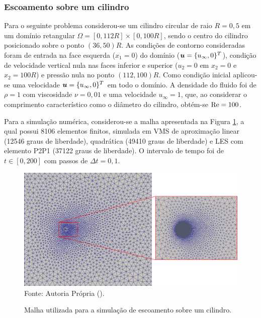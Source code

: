 \subsubsection{Escoamento sobre um cilindro}

Para o seguinte problema considerou-se um cilindro circular de raio $R=0,5$ em um domínio retangular $\Omega=[0,112R]\times[0,100R]$, sendo o centro do cilindro posicionado sobre o ponto $(36,50)R$. As condições de contorno consideradas foram de entrada na face esquerda ($x_1=0$) do domínio ($\boldsymbol{u}=\{u_\infty,0\}^T$), condição de velocidade vertical nula nas faces inferior e superior ($u_2=0$ em $x_2=0$ e $x_2=100R$) e pressão nula no ponto $(112,100)R$. Como condição inicial aplicou-se uma velocidade $\boldsymbol{u}=\{u_\infty,0\}^T$ em todo o domínio. A densidade do fluido foi de $\rho=1$ com viscosidade $\nu=0,01$ e uma velocidade $u_\infty=1$, que, ao considerar o comprimento característico como o diâmetro do cilindro, obtém-se $\mathrm{Re}=100$.

Para a simulação numérica, considerou-se a malha apresentada na Figura \ref{fig:cyl-mesh}, a qual possui 8106 elementos finitos, simulada em VMS de aproximação linear (12546 graus de liberdade), quadrática (49410 graus de liberdade) e LES com elemento P2P1 (37122 graus de liberdade). O intervalo de tempo foi de $t\in[0,200]$ com passos de $\Delta t=0,1$.

\begin{figure}[h!]
    \centering
    \caption{Malha utilizada para a simulação de escoamento sobre um cilindro.}
    \includegraphics[width=\linewidth]{Figuras/cylinder/mesh.png}
    \\Fonte: Autoria Própria (\the\year).
    \label{fig:cyl-mesh}
\end{figure}

